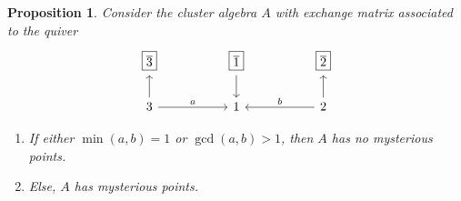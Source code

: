 \documentclass[10pt,a4paper]{amsart}
\newtheorem{proposition}{Proposition}
\begin{document}
\begin{proposition}\label{prop:3-vertices}
Consider the cluster algebra $A$ with exchange matrix associated to the quiver
\[\begin{tikzcd}
	{\boxed{\overline{3}}} && {\boxed{\overline{1}}} && {\boxed{\overline{2}}} \\
	3 && 1 && 2
	\arrow[from=1-3, to=2-3]
	\arrow[from=2-1, to=1-1]
	\arrow["a", from=2-1, to=2-3]
	\arrow[from=2-5, to=1-5]
	\arrow["b"', from=2-5, to=2-3]
\end{tikzcd}\]
\begin{enumerate}
    \item If either $\min(a,b) = 1$ or $\gcd(a,b) > 1$, then $A$ has no mysterious points.
    \item Else, $A$ has mysterious points. 
\end{enumerate}
\end{proposition}
\end{document}
